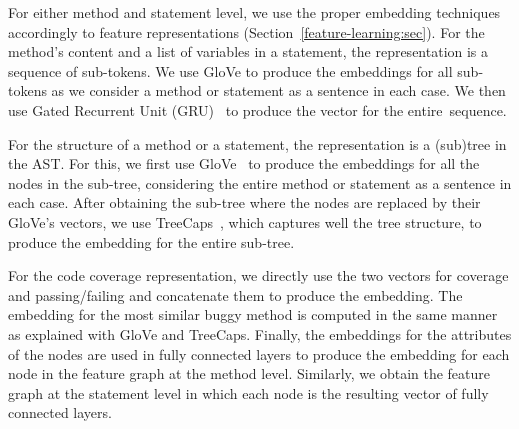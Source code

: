 For either method and statement level, we use the proper embedding
techniques accordingly to feature representations
(Section~\ref{feature-learning:sec}). For the method's content
and a list of variables in a statement, the representation is a
sequence of sub-tokens. We use GloVe \cite{glove2014} to produce the
embeddings for all sub-tokens as we consider a method or statement as
a sentence in each case. We then use Gated Recurrent Unit
(GRU)~\cite{GRU-cho14} to produce the vector for the entire~sequence.

For the structure of a method or a statement, the representation is a
(sub)tree in the AST. For this, we first use GloVe~\cite{glove2014} to
produce the embeddings for all the nodes in the sub-tree, considering
the entire method or statement as a sentence in each case. After
obtaining the sub-tree where the nodes are replaced by their GloVe's
vectors, we use TreeCaps~\cite{bui2021treecaps}, which captures well
the tree structure, to produce the embedding for the entire sub-tree.

For the code coverage representation, we directly use the two vectors
for coverage and passing/failing and concatenate them to produce the
embedding. The embedding for the most similar buggy method is computed
in the same manner as explained with GloVe and TreeCaps. Finally, the
embeddings for the attributes of the nodes are used in fully connected
layers to produce the embedding for each node in the feature graph at
the method level. Similarly, we obtain the feature graph at the
statement level in which each node is the resulting vector of fully
connected layers.


